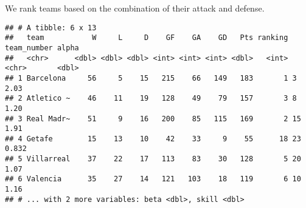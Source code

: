 \documentclass[
]{article}
\newenvironment{Shaded}{\begin{snugshade}}{\end{snugshade}}
\newcommand{\AttributeTok}[1]{\textcolor[rgb]{0.77,0.63,0.00}{#1}}
\newcommand{\DecValTok}[1]{\textcolor[rgb]{0.00,0.00,0.81}{#1}}
\newcommand{\FunctionTok}[1]{\textcolor[rgb]{0.00,0.00,0.00}{#1}}
\newcommand{\NormalTok}[1]{#1}
\newcommand{\OtherTok}[1]{\textcolor[rgb]{0.56,0.35,0.01}{#1}}
\newcommand{\SpecialCharTok}[1]{\textcolor[rgb]{0.00,0.00,0.00}{#1}}
\newcommand{\StringTok}[1]{\textcolor[rgb]{0.31,0.60,0.02}{#1}}
\begin{document}
We rank teams based on the combination of their attack and defense.

\begin{Shaded}
\end{Shaded}

\begin{verbatim}
## # A tibble: 6 x 13
##   team           W     L     D    GF    GA    GD   Pts ranking team_number alpha
##   <chr>      <dbl> <dbl> <dbl> <int> <int> <int> <dbl>   <int> <chr>       <dbl>
## 1 Barcelona     56     5    15   215    66   149   183       1 3           2.03 
## 2 Atletico ~    46    11    19   128    49    79   157       3 8           1.20 
## 3 Real Madr~    51     9    16   200    85   115   169       2 15          1.91 
## 4 Getafe        15    13    10    42    33     9    55      18 23          0.832
## 5 Villarreal    37    22    17   113    83    30   128       5 20          1.07 
## 6 Valencia      35    27    14   121   103    18   119       6 10          1.16 
## # ... with 2 more variables: beta <dbl>, skill <dbl>
\end{verbatim}
\end{document}
